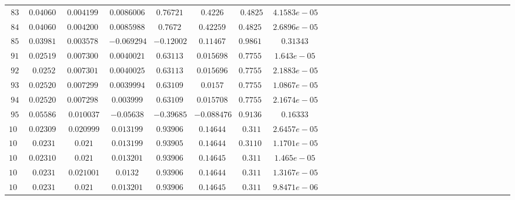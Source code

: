 \begin{table}[!htbp]
\begin{tabular}{c c c c c c c c c c c c c c c c c c c c c c c c c c c c c c c }
$83 $&$0.040603$&$ 0.0041998$&$ 0.0086006$&$0.76721$&$   0.4226$&$   0.4825$&$4.1583e-05$\\
$84 $&$0.040602$&$0.0042008$&$0.0085988$&$   0.7672$&$  0.42259$&$  0.48251$&$2.6896e-05$\\
$85 $&$0.039819$&$0.0035788$&$-0.069294$&$ -0.12002$&$  0.11467 $&$0.98613$&$0.31343$\\
$91 $&$0.025199$&$0.0073006$&$0.0040021$&$ 0.63113$&$0.015698$&$0.77552$&$1.643e-05$\\
$92 $&$0.0252   $&$0.0073011$&$ 0.0040025$&$   0.63113$&$0.015696$&$  0.77552$&$2.1883e-05$\\
$93 $&$0.025201$&$0.0072998$&$ 0.0039994$&$   0.63109$&$  0.0157 $&$0.77555$&$1.0867e-05$\\
$94 $&$0.025201$&$0.0072982$&$ 0.003999$&$  0.63109$&$0.015708$&$0.77555$&$2.1674e-05$\\
$95 $&$0.055862$&$ 0.010037$&$ -0.05638$&$ -0.39685$&$-0.088476 $&$0.91361 $&$0.16333$\\
$101 $&$0.023098$&$ 0.020999$&$ 0.013199$&$0.93906$&$ 0.14644 $&$0.311$&$2.6457e-05$\\
$102 $&$0.0231$&$  0.021$&$0.013199$&$0.93905$&$0.14644$&$0.31102$&$1.1701e-05$\\
$103 $&$0.023101 $&$      0.021$&$0.013201$&$0.93906$&$0.14645$&$0.311$&$1.465e-05$\\
$104 $&$0.0231    $&$0.021001$&$ 0.0132$&$0.93906$&$0.14644$&$  0.311$&$1.3167e-05$\\
$105 $&$0.0231      $&$ 0.021$&$ 0.013201$&$0.93906 $&$0.14645$&$0.311$&$9.8471e-06$\\

\hline 

\end{tabular}
\end{table}
